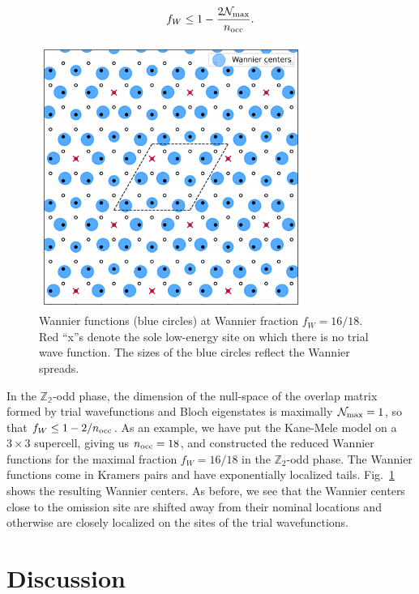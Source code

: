 \documentclass[galley,aps,pra,10pt,amsmath,amssymb,
    superscriptaddress,nofootinbib,longbibliography]{revtex4-2}
\begin{document}
\begin{equation}
   f_W \leq 1 - \frac{2\mathcal{N}_{\rm max}}{n_{\rm occ}}.
\end{equation}

\begin{figure}[t]
\begin{center}
\includegraphics[width=3.4in]{fig14.png}
\end{center}
\vspace{-5mm}
\caption{Wannier functions (blue circles) at Wannier fraction $f_W = 16/18$. Red ``x''s denote the sole low-energy site on which there is no trial wave function. The sizes of the blue circles reflect the Wannier spreads.}
\label{FIG14}
\end{figure}

In the $\mathbb{Z_2}$-odd phase, the dimension of the null-space of the overlap matrix formed by trial wavefunctions and Bloch eigenstates is maximally $\mathcal{N}_{\rm max}=1$, so that $f_W \leq 1 - 2/n_{\rm occ}$. As an example, we have put the Kane-Mele model on a $3\times 3$ supercell, giving us $n_{\rm occ} = 18$, and constructed the reduced Wannier functions for the maximal fraction $f_W = 16/18$ in the $\mathbb{Z}_2$-odd phase. The Wannier functions come in Kramers pairs and have exponentially localized tails. Fig.~\ref{FIG14} shows the resulting Wannier centers. As before, we see that the Wannier centers close to the omission site are shifted away from their nominal locations and otherwise are closely localized on the sites of the trial wavefunctions. 


\section{Discussion}
\end{document}
